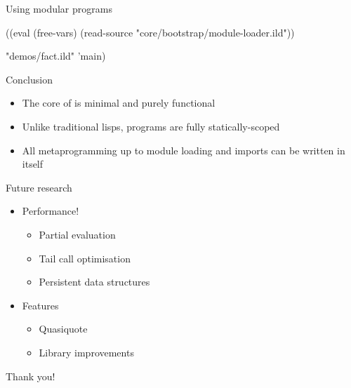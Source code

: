 \begin{frame}[fragile]{Using modular programs}
\begin{listingbox}\begin{ildcode}
((eval (free-vars) (read-source
  "core/bootstrap/module-loader.ild"))

  "demos/fact.ild"
  'main)
\end{ildcode}\end{listingbox}
\end{frame}

\begin{frame}{Conclusion}
\begin{itemize}
  \item The core of \lang is minimal and purely functional
  \item Unlike traditional lisps, \lang programs are fully statically-scoped
  \item All metaprogramming up to module loading and imports can be written in \lang itself
\end{itemize}
\end{frame}

\begin{frame}[fragile]{Future research}
\begin{itemize}
  \item Performance!
    \begin{itemize}
      \item Partial evaluation
      \item Tail call optimisation
      \item Persistent data structures
    \end{itemize}
  \item Features
    \begin{itemize}
      \item Quasiquote
      \item Library improvements
    \end{itemize}
\end{itemize}
\end{frame}

\begin{frame}
\begin{center}
\Huge Thank you!
\end{center}
\end{frame}

